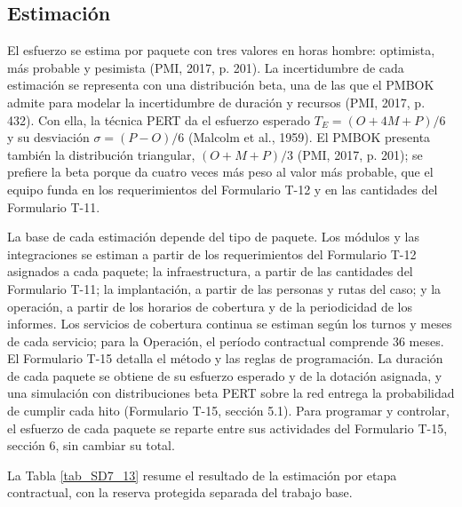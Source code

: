 \subsection{Estimación}

El esfuerzo se estima por paquete con tres valores en horas hombre: optimista, más probable y pesimista (PMI, 2017, p. 201). La incertidumbre de cada estimación se representa con una distribución beta, una de las que el PMBOK admite para modelar la incertidumbre de duración y recursos (PMI, 2017, p. 432). Con ella, la técnica PERT da el esfuerzo esperado \(T_E = (O + 4M + P)/6\) y su desviación \(\sigma = (P - O)/6\) (Malcolm et al., 1959). El PMBOK presenta también la distribución triangular, \((O + M + P)/3\) (PMI, 2017, p. 201); se prefiere la beta porque da cuatro veces más peso al valor más probable, que el equipo funda en los requerimientos del Formulario T-12 y en las cantidades del Formulario T-11.

La base de cada estimación depende del tipo de paquete. Los módulos y las integraciones se estiman a partir de los requerimientos del Formulario T-12 asignados a cada paquete; la infraestructura, a partir de las cantidades del Formulario T-11; la implantación, a partir de las personas y rutas del caso; y la operación, a partir de los horarios de cobertura y de la periodicidad de los informes. Los servicios de cobertura continua se estiman según los turnos y meses de cada servicio; para la Operación, el período contractual comprende 36 meses. El Formulario T-15 detalla el método y las reglas de programación. La duración de cada paquete se obtiene de su esfuerzo esperado y de la dotación asignada, y una simulación con distribuciones beta PERT sobre la red entrega la probabilidad de cumplir cada hito (Formulario T-15, sección 5.1). Para programar y controlar, el esfuerzo de cada paquete se reparte entre sus actividades del Formulario T-15, sección 6, sin cambiar su total.

La Tabla \ref{tab_SD7_13} resume el resultado de la estimación por etapa contractual, con la reserva protegida separada del trabajo base.


